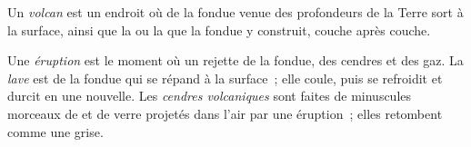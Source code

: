 \begin{definition}[Volcan]\label{def:g4:volcanoes-earthquakes-first-look:volcano}
Un \emph{volcan} est un endroit où de la  fondue venue
des profondeurs de la Terre sort à la surface, ainsi que la  ou la
 que la  fondue y construit, couche après couche.
\end{definition}

\begin{definition}\label{def:g4:volcanoes-earthquakes-first-look:eruption}
Une \emph{éruption} est le moment où un 
rejette de la  fondue, des cendres et des gaz. La \emph{lave}
est de la  fondue qui se répand à la surface~; elle coule, puis se
refroidit et durcit en une  nouvelle. Les
\emph{cendres volcaniques} sont faites de
minuscules morceaux de  et de verre projetés dans l'air par une
éruption~; elles retombent comme une  grise.
\end{definition}

